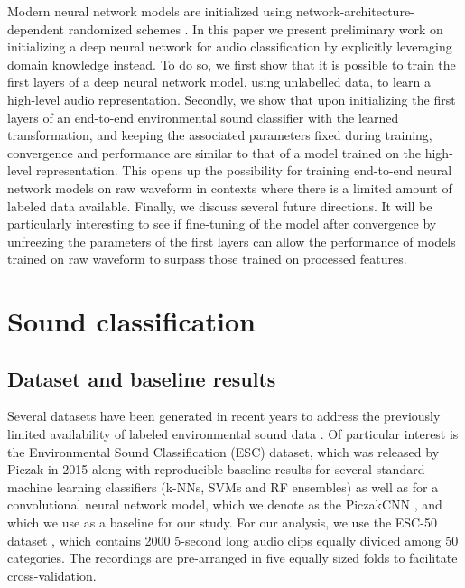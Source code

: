 \documentclass{article}
\begin{document}
Modern neural network models are initialized using network-architecture-dependent randomized schemes \cite{DBLP:journals/corr/HeZR015}\cite{pmlr-v9-glorot10a}. In this paper we present preliminary work on initializing a deep neural network for audio classification by explicitly leveraging domain knowledge instead. To do so, we first show that it is possible to train the first layers of a deep neural network model, using unlabelled data, to learn a high-level audio representation. Secondly, we show that upon initializing the first layers of an end-to-end environmental sound classifier with the learned transformation, and keeping the associated parameters fixed during training, convergence and performance are similar to that of a model trained on the high-level representation. This opens up the possibility for training end-to-end neural network models on raw waveform in contexts where there is a limited amount of labeled data available. Finally, we discuss several future directions. It will be particularly interesting to see if fine-tuning of the model after convergence by unfreezing the parameters of the first layers can allow the performance of models trained on raw waveform to surpass those trained on processed features.

\section{Sound classification}
\subsection{Dataset and baseline results}
Several datasets have been generated in recent years to address the previously limited availability of labeled environmental sound data \cite{salamon2014dataset}\cite{45857}\cite{piczak2015esc}. Of particular interest is the Environmental Sound Classification (ESC) dataset, which was released by Piczak in 2015 along with reproducible baseline results for several standard machine learning classifiers (k-NNs, SVMs and RF ensembles) \cite{piczak2015esc} as well as for a convolutional neural network model, which we denote as the PiczakCNN \cite{piczak2015environmental}, and which we use as a baseline for our study. For our analysis, we use the ESC-50 dataset \cite{piczak2015esc}, which contains 2000 5-second long audio clips equally divided among 50 categories. The recordings are pre-arranged in five equally sized folds to facilitate cross-validation.
\end{document}
